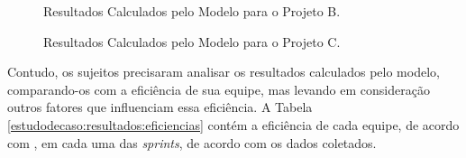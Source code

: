 \begin{figure}[H]
\begin{center}
	\end{center}
	\caption{Resultados Calculados pelo Modelo para o Projeto B.}
	\label{estudodecaso:resultados:projetoB}
\end{figure}

\begin{figure}[H]
\begin{center}
	\end{center}
	\caption{Resultados Calculados pelo Modelo para o Projeto C.}
	\label{estudodecaso:resultados:projetoC}
\end{figure}

Contudo, os sujeitos precisaram analisar os resultados calculados pelo modelo, comparando-os com a eficiência de sua equipe, mas levando em consideração outros fatores que influenciam essa eficiência. A Tabela \ref{estudodecaso:resultados:eficiencias} contém a eficiência de cada equipe, de acordo com \cite{kumar}, em cada uma das \textit{sprints}, de acordo com os dados coletados.

